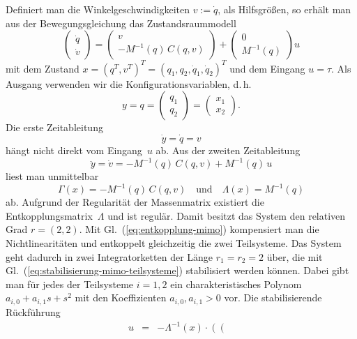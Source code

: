 \begin{example}
Definiert man die Winkelgeschwindigkeiten $v:=\dot{q}$, als Hilfsgrößen,
so erhält man aus der Bewegungsgleichung das Zustandsraummodell
\begin{equation}
\left(\begin{array}{c}
\dot{q}\\
\dot{v}
\end{array}\right)=\left(\begin{array}{c}
v\\
-M^{-1}(q)\,C(q,v)
\end{array}\right)+\left(\begin{array}{c}
0\\
M^{-1}(q)
\end{array}\right)u\label{eq:mani-zustandsdarstellung}
\end{equation}
mit dem Zustand $x=(q^{T},v^{T})^{T}=(q_{1},q_{2},\dot{q}_{1},\dot{q}_{2})^{T}$
und dem Eingang $u=\tau$. Als Ausgang verwenden wir die Konfigurationsvariablen,
d.\,h. 
\begin{equation}
y=q=\left(\begin{array}{c}
q_{1}\\
q_{2}
\end{array}\right)=\left(\begin{array}{c}
x_{1}\\
x_{2}
\end{array}\right).\label{eq:y-q-mani}
\end{equation}
Die erste Zeitableitung 
\begin{equation}
\dot{y}=\dot{q}=v\label{eq:dy-v-mani}
\end{equation}
hängt nicht direkt vom Eingang~$u$ ab. Aus der zweiten Zeitableitung
\[
\ddot{y}=\dot{v}=-M^{-1}(q)\,C(q,v)+M^{-1}(q)\,u
\]
liest man unmittelbar
\[
\Gamma(x)=-M^{-1}(q)\,C(q,v)\quad\text{und}\quad\Lambda(x)=M^{-1}(q)
\]
ab. Aufgrund der Regularität der Massenmatrix existiert die Entkopplungsmatrix~$\Lambda$
und ist regulär. Damit besitzt das System den relativen Grad $r=(2,2)$.
Mit Gl.~(\ref{eq:entkopplung-mimo}) kompensiert man die Nichtlinearitäten
und entkoppelt gleichzeitig die zwei Teilsysteme. Das System geht
dadurch in zwei Integratorketten der Länge $r_{1}=r_{2}=2$ über,
die mit Gl.~(\ref{eq:stabilisierung-mimo-teilsysteme}) stabilisiert
werden können. Dabei gibt man für jedes der Teilsysteme $i=1,2$ ein
charakteristisches Polynom $a_{i,0}+a_{i,1}s+s^{2}$ mit den Koeffizienten
$a_{i,0},a_{i,1}>0$ vor. Die stabilisierende Rückführung 
\[
\begin{array}{lcl}
u & = & -\Lambda^{-1}(x)\cdot\left(\left(\begin{array}{c}

\end{array}
\end{array}\]
\end{example}
